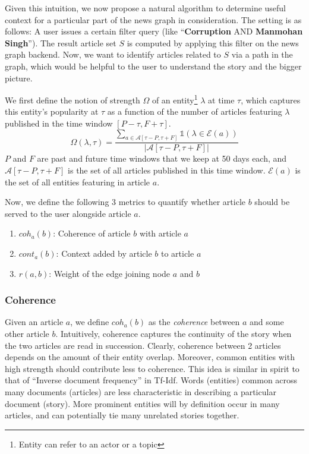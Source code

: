 Given this intuition, we now propose a natural algorithm to determine useful context for a particular part of
the news graph in consideration. The setting is as follows: A user issues a certain filter query (like ``{\bf Corruption} AND {\bf Manmohan Singh}''). The result article set $S$ is computed by applying this filter on the news graph backend. Now, we want to identify articles
related to $S$ via a path in the graph, which would be helpful to the user to understand the story and the bigger picture.

We first define the notion of strength $\Omega$ of an entity\footnote{Entity can refer to an actor or a topic} $\lambda$ at time $\tau$, which captures this entity's popularity at $\tau$ as a function of the number of articles featuring $\lambda$ published in the time window $[P - \tau, F + \tau]$.
\begin{equation}
\Omega(\lambda, \tau) = \frac{\sum_{a \in \mathcal{A}[\tau - P, \tau + F]}{\mathbb{1}(\lambda \in \mathcal{E}(a))}}{|\mathcal{A}[\tau - P, \tau + F]|}
\end{equation}
$P$ and $F$ are past and future time windows that we keep at 50 days each, and $\mathcal{A}[\tau - P, \tau + F]$ is the set of all articles published in this time window. $\mathcal{E}(a)$ is the set of all entities featuring in article $a$.

Now, we define the following 3 metrics to quantify whether article $b$ should be served to the user alongside article $a$.
\begin{enumerate}
\item $coh_a(b)$: Coherence of article $b$ with article $a$
\item $cont_a(b)$: Context added by article $b$ to article $a$ 
\item $r(a, b)$: Weight of the edge joining node $a$ and $b$
\end{enumerate}

\subsubsection*{Coherence}
Given an article $a$, we define $coh_{a}(b)$ as the \emph{coherence} between $a$ and some other article $b$. Intuitively, coherence captures the continuity of the story when the two articles are read in succession.
Clearly, coherence between 2 articles depends on the amount of their entity overlap. Moreover, common entities with high strength should contribute less to coherence. This idea is similar in spirit to that of ``Inverse document frequency'' in Tf-Idf. Words (entities) common across many documents (articles) are less characteristic in describing a particular document (story). 
More prominent entities will by definition occur in many articles, and can potentially tie many unrelated stories together. 

